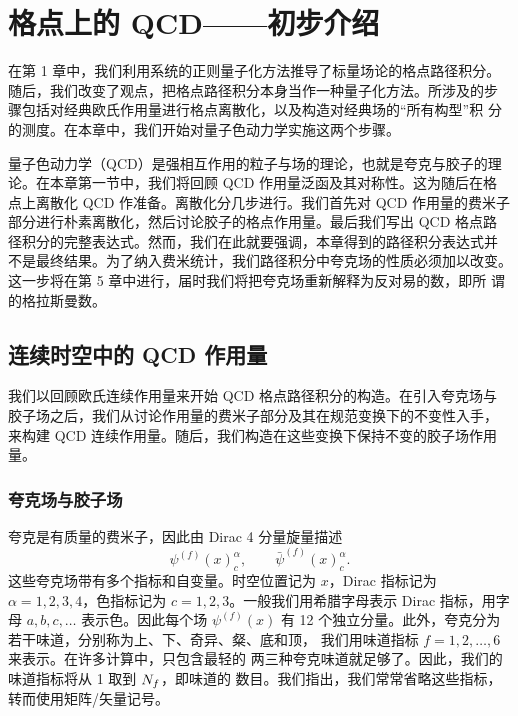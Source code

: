 
\chapter{格点上的 QCD——初步介绍}

在第 1 章中，我们利用系统的正则量子化方法推导了标量场论的格点路径积分。
随后，我们改变了观点，把格点路径积分本身当作一种量子化方法。所涉及的步
骤包括对经典欧氏作用量进行格点离散化，以及构造对经典场的“所有构型”积
分的测度。在本章中，我们开始对量子色动力学实施这两个步骤。

量子色动力学（QCD）是强相互作用的粒子与场的理论，也就是夸克与胶子的理
论。在本章第一节中，我们将回顾 QCD 作用量泛函及其对称性。这为随后在格
点上离散化 QCD 作准备。离散化分几步进行。我们首先对 QCD 作用量的费米子
部分进行朴素离散化，然后讨论胶子的格点作用量。最后我们写出 QCD 格点路
径积分的完整表达式。然而，我们在此就要强调，本章得到的路径积分表达式并
不是最终结果。为了纳入费米统计，我们路径积分中夸克场的性质必须加以改变。
这一步将在第 5 章中进行，届时我们将把夸克场重新解释为反对易的数，即所
谓的格拉斯曼数。

\section{连续时空中的 QCD 作用量}

我们以回顾欧氏连续作用量来开始 QCD 格点路径积分的构造。在引入夸克场与
胶子场之后，我们从讨论作用量的费米子部分及其在规范变换下的不变性入手，
来构建 QCD 连续作用量。随后，我们构造在这些变换下保持不变的胶子场作用量。

\subsection{夸克场与胶子场}

夸克是有质量的费米子，因此由 Dirac 4 分量旋量描述
\begin{equation}
  \psi^{(f)}(x)^\alpha_c , \qquad \bar\psi^{(f)}(x)^\alpha_c .
\end{equation}
这些夸克场带有多个指标和自变量。时空位置记为 $x$，Dirac 指标记为
$\alpha = 1, 2, 3, 4$，色指标记为 $c = 1, 2, 3$。一般我们用希腊字母表示
Dirac 指标，用字母 $a, b, c, \ldots$ 表示色。因此每个场 $\psi^{(f)}(x)$ 有
12 个独立分量。此外，夸克分为若干味道，分别称为上、下、奇异、粲、底和顶，
我们用味道指标 $f = 1, 2, \ldots, 6$ 来表示。在许多计算中，只包含最轻的
两三种夸克味道就足够了。因此，我们的味道指标将从 1 取到 $N_f$，即味道的
数目。我们指出，我们常常省略这些指标，转而使用矩阵/矢量记号。

